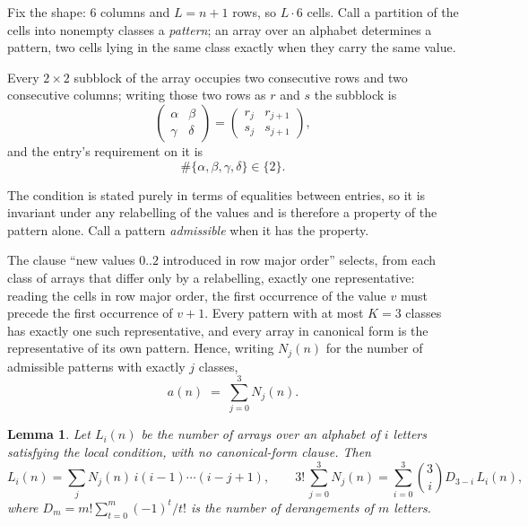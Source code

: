 \documentclass[11pt,a4paper]{article}
\theoremstyle{plain}
\newtheorem{lemma}[theorem]{Lemma}
\theoremstyle{definition}
\begin{document}
Fix the shape: $6$ columns and $L=n+1$ rows, so $L\cdot6$ cells. Call a
partition of the cells into nonempty classes a \emph{pattern}; an array over an alphabet
determines a pattern, two cells lying in the same class exactly when they carry the same
value.

Every $2\times2$ subblock of the array occupies two consecutive
rows and two consecutive columns; writing those two rows as $r$ and $s$ the
subblock is
\[
\begin{pmatrix}\alpha&\beta\\\gamma&\delta\end{pmatrix}=\begin{pmatrix}r_j&r_{j+1}\\s_j&s_{j+1}\end{pmatrix},
\]
and the entry's requirement on it is
\begin{equation}\label{eq:loc}
\#\{\alpha,\beta,\gamma,\delta\}\in\{2\}.
\end{equation}

The condition is stated purely in terms of equalities between entries, so it is invariant
under any relabelling of the values and is therefore a property of the pattern alone. Call a
pattern \emph{admissible} when it has the property.

The clause ``new values $0..2$ introduced in row major order'' selects, from each class
of arrays that differ only by a relabelling, exactly one representative: reading the cells in
row major order, the first occurrence of the value $v$ must precede the first occurrence of
$v+1$. Every pattern with at most $K=3$ classes has exactly one such representative, and
every array in canonical form is the representative of its own pattern. Hence, writing
$N_j(n)$ for the number of admissible patterns with exactly $j$ classes,
\begin{equation}\label{eq:apat}
a(n)\;=\;\sum_{j=0}^{3}N_j(n).
\end{equation}

\begin{lemma}\label{lem:inv}
Let $L_i(n)$ be the number of arrays over an alphabet of $i$ letters satisfying the local
condition, with no canonical-form clause. Then
\[
L_i(n)=\sum_j N_j(n)\,i(i-1)\cdots(i-j+1),
\qquad
3!\,\sum_{j=0}^{3}N_j(n)=\sum_{i=0}^{3}\binom{3}{i}D_{3-i}\,L_i(n),
\]
where $D_m=m!\sum_{t=0}^{m}(-1)^t/t!$ is the number of derangements of $m$ letters.
\end{lemma}
\end{document}
